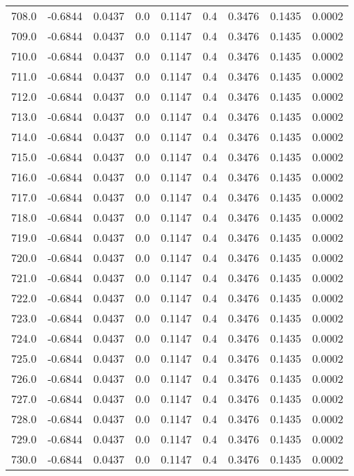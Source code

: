 \begin{longtable}{lrrrrrrrr}
708.0 & -0.6844 & 0.0437 & 0.0 & 0.1147 & 0.4 & 0.3476 & 0.1435 & 0.0002 \\
709.0 & -0.6844 & 0.0437 & 0.0 & 0.1147 & 0.4 & 0.3476 & 0.1435 & 0.0002 \\
710.0 & -0.6844 & 0.0437 & 0.0 & 0.1147 & 0.4 & 0.3476 & 0.1435 & 0.0002 \\
711.0 & -0.6844 & 0.0437 & 0.0 & 0.1147 & 0.4 & 0.3476 & 0.1435 & 0.0002 \\
712.0 & -0.6844 & 0.0437 & 0.0 & 0.1147 & 0.4 & 0.3476 & 0.1435 & 0.0002 \\
713.0 & -0.6844 & 0.0437 & 0.0 & 0.1147 & 0.4 & 0.3476 & 0.1435 & 0.0002 \\
714.0 & -0.6844 & 0.0437 & 0.0 & 0.1147 & 0.4 & 0.3476 & 0.1435 & 0.0002 \\
715.0 & -0.6844 & 0.0437 & 0.0 & 0.1147 & 0.4 & 0.3476 & 0.1435 & 0.0002 \\
716.0 & -0.6844 & 0.0437 & 0.0 & 0.1147 & 0.4 & 0.3476 & 0.1435 & 0.0002 \\
717.0 & -0.6844 & 0.0437 & 0.0 & 0.1147 & 0.4 & 0.3476 & 0.1435 & 0.0002 \\
718.0 & -0.6844 & 0.0437 & 0.0 & 0.1147 & 0.4 & 0.3476 & 0.1435 & 0.0002 \\
719.0 & -0.6844 & 0.0437 & 0.0 & 0.1147 & 0.4 & 0.3476 & 0.1435 & 0.0002 \\
720.0 & -0.6844 & 0.0437 & 0.0 & 0.1147 & 0.4 & 0.3476 & 0.1435 & 0.0002 \\
721.0 & -0.6844 & 0.0437 & 0.0 & 0.1147 & 0.4 & 0.3476 & 0.1435 & 0.0002 \\
722.0 & -0.6844 & 0.0437 & 0.0 & 0.1147 & 0.4 & 0.3476 & 0.1435 & 0.0002 \\
723.0 & -0.6844 & 0.0437 & 0.0 & 0.1147 & 0.4 & 0.3476 & 0.1435 & 0.0002 \\
724.0 & -0.6844 & 0.0437 & 0.0 & 0.1147 & 0.4 & 0.3476 & 0.1435 & 0.0002 \\
725.0 & -0.6844 & 0.0437 & 0.0 & 0.1147 & 0.4 & 0.3476 & 0.1435 & 0.0002 \\
726.0 & -0.6844 & 0.0437 & 0.0 & 0.1147 & 0.4 & 0.3476 & 0.1435 & 0.0002 \\
727.0 & -0.6844 & 0.0437 & 0.0 & 0.1147 & 0.4 & 0.3476 & 0.1435 & 0.0002 \\
728.0 & -0.6844 & 0.0437 & 0.0 & 0.1147 & 0.4 & 0.3476 & 0.1435 & 0.0002 \\
729.0 & -0.6844 & 0.0437 & 0.0 & 0.1147 & 0.4 & 0.3476 & 0.1435 & 0.0002 \\
730.0 & -0.6844 & 0.0437 & 0.0 & 0.1147 & 0.4 & 0.3476 & 0.1435 & 0.0002 \\

\end{longtable}
